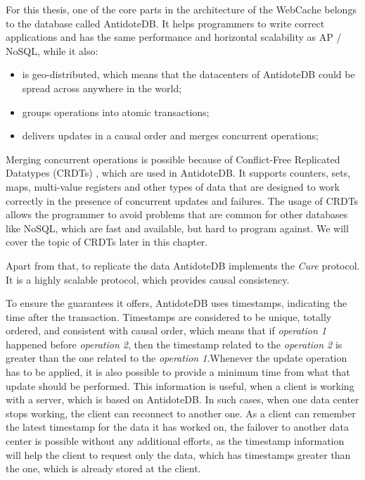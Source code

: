 For this thesis, one of the core parts in the architecture of the WebCache belongs to the database called AntidoteDB\cite{4}. It helps programmers to write correct applications and has the same performance and horizontal scalability as AP / NoSQL\cite{14}, while it also:

\begin{itemize}
\item {is geo-distributed, which means that the datacenters of AntidoteDB could be spread across anywhere in the world;}
\item {groups operations into atomic transactions\cite{9, 15};}
\item {delivers updates in a causal order and merges concurrent operations;}
\end{itemize} 

Merging concurrent operations is possible because of Conflict-Free Replicated Datatypes (CRDTs) \cite{2}, which are used in AntidoteDB. It supports counters, sets, maps, multi-value registers and other types of data that are designed to work correctly in the presence of concurrent updates and failures. The usage of CRDTs allows the programmer to avoid problems that are common for other databases like NoSQL, which are fast and available, but hard to program against\cite{15}. We will cover the topic of CRDTs later in this chapter.

Apart from that, to replicate the data AntidoteDB implements the \textit{Cure}\cite{15} protocol. It is a highly scalable protocol, which provides causal consistency. 

To ensure the guarantees it offers, AntidoteDB uses timestamps, indicating the time after the transaction. Timestamps are considered to be unique, totally ordered, and consistent with causal order, which means that if \textit{operation 1} happened before \textit{operation 2}, then the timestamp related to the \textit{operation 2} is greater than the one related to the \textit{operation 1}\cite{2}.Whenever the update operation has to be applied, it is also possible to provide a minimum time from what that update should be performed. This information is useful, when a client is working with a server, which is based on AntidoteDB. In such cases, when one data center stops working, the client can reconnect to another one. As a client can remember the latest timestamp for the data it has worked on, the failover to another data center is possible without any additional efforts, as the timestamp information will help the client to request only the data, which has timestamps greater than the one, which is already stored at the client.

